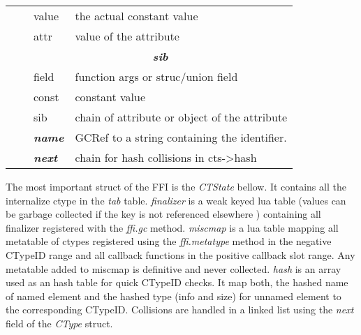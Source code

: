 \begin{table}[p]
\begin{tabular}{ll|l|l|}
                             &                & value                  & the actual constant value                          \\
                             &                & attr                   & value of the attribute                             \\ \cline{3-4}
                             &                & \multicolumn{2}{c|}{\textit{\textbf{sib}}}                                  \\ \cline{3-4}
                             &                & field                  & function args or struc/union field                 \\
                             &                & const                  & constant value                                     \\
                             &                & sib                    & chain of attribute or object of the attribute      \\ \cline{3-4}
                             &                & \textit{\textbf{name}} & GCRef to a string containing the identifier.       \\ \cline{3-4}
                             &                & \textit{\textbf{next}} & chain for hash collisions in cts-\textgreater hash \\ \cline{3-4}
\end{tabular}
\end{table}

The most important struct of the FFI is the \emph{CTState} bellow. It contains
all the internalize ctype in the \emph{tab} table. \emph{finalizer} is a weak
keyed lua table (values can be garbage collected if the key is not referenced
elsewhere ) containing all finalizer registered with the \emph{ffi.gc} method.
\emph{miscmap} is a lua table mapping all metatable of ctypes registered using
the \emph{ffi.metatype} method in the negative CTypeID range and all callback
functions in the positive callback slot range. Any metatable added to miscmap is
definitive and never collected. \emph{hash} is an array used as an hash table
for quick CTypeID checks. It map both, the hashed name of named element and the
hashed type (info and size) for unnamed element to the corresponding CTypeID.
Collisions are handled in a linked list using the \emph{next} field of the
\emph{CType} struct.

